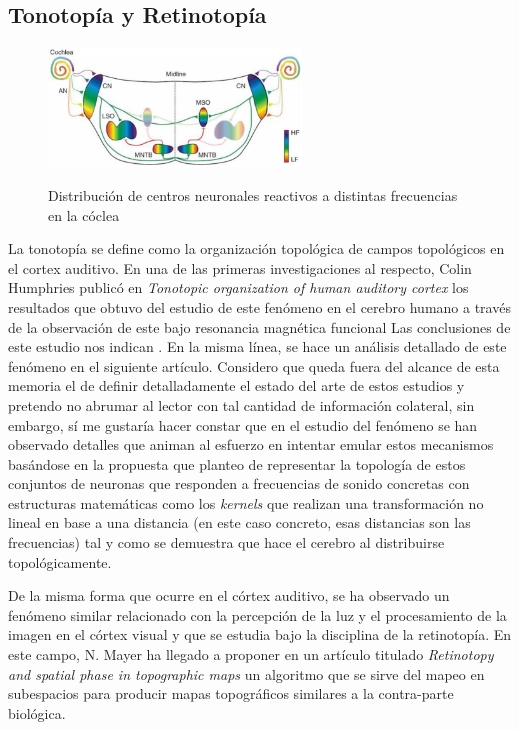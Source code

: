 \documentclass[10pt,a4paper]{report}
\begin{document}
\subsection{Tonotopía y Retinotopía}
\begin{figure}[h!]{}
    \centering
    \includegraphics[width=0.6\textwidth]{img/Hearing_sound_localization_circuits_brainstem.jpg}
    \label{fig:DistribucionFreq}
    \caption{Distribución de centros neuronales reactivos a distintas frecuencias en la cóclea}
\end{figure}

La tonotopía se define como la organización topológica de campos topológicos en el cortex auditivo. En una de las primeras investigaciones al respecto, Colin Humphries publicó en \textit{Tonotopic organization of human auditory cortex}\citep{Humphries20101202} los resultados que obtuvo del estudio de este fenómeno en el cerebro humano a través de la observación de este bajo resonancia magnética funcional Las conclusiones de este estudio nos indican . En la misma línea, se hace un análisis detallado de este fenómeno en el siguiente artículo\citep{Clopton19741}. Considero que queda fuera del alcance de esta memoria el de definir detalladamente el estado del arte de estos estudios y pretendo no abrumar al lector con tal cantidad de información colateral, sin embargo, sí me gustaría hacer constar que en el estudio del fenómeno se han observado detalles que animan al esfuerzo en intentar emular estos mecanismos basándose en la propuesta que planteo de representar la topología de estos conjuntos de neuronas que responden a frecuencias de sonido concretas con estructuras matemáticas como los \textit{kernels} que realizan una transformación no lineal en base a una distancia (en este caso concreto, esas distancias son las frecuencias) tal y como se demuestra que hace el cerebro al distribuirse topológicamente.  

De la misma forma que ocurre en el córtex auditivo, se ha observado un fenómeno similar relacionado con la percepción de la luz y el procesamiento de la imagen en el córtex visual y que se estudia bajo la disciplina de la retinotopía. En este campo, N. Mayer ha llegado a proponer en un artículo titulado \textit{Retinotopy and spatial phase in topographic maps}\citep{Mayer2000447} un algoritmo que se sirve del mapeo en subespacios para producir mapas topográficos similares a la contra-parte biológica.
\end{document}
